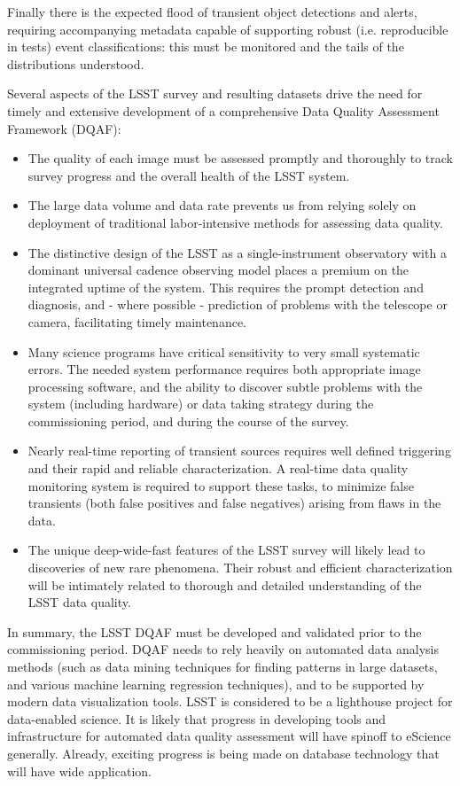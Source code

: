 \documentclass[SE,toc]{lsstdoc}
\begin{document}
Finally there is the expected flood of transient object detections and alerts, requiring accompanying metadata capable of supporting robust (i.e. reproducible in tests) event classifications: this must be monitored and the tails of the distributions understood.

Several aspects of the LSST survey and resulting datasets drive the need for timely and
extensive development of a comprehensive Data Quality Assessment Framework (DQAF):
\begin{itemize}
\item The quality of each image must be assessed promptly and thoroughly to track
         survey progress and the overall health of the LSST system.
\item The large data volume and data rate prevents us from relying solely on deployment of traditional
         labor-intensive methods for assessing data quality.
\item The distinctive design of the LSST as a single-instrument observatory with a dominant universal cadence observing     model places a premium on the integrated uptime of the system.  This requires the prompt detection and diagnosis, and - where possible - prediction of problems with the telescope or camera, facilitating timely maintenance.
\item Many science programs have critical sensitivity to very small systematic errors. The needed system
          performance requires both appropriate image processing software, and the ability
          to discover subtle problems with the system (including hardware) or data taking strategy during the
         commissioning period, and during the course of the survey.
\item Nearly real-time reporting of transient sources requires well defined triggering and their
          rapid and reliable characterization. A real-time data quality monitoring system is required to
          support these tasks, to minimize false transients (both false positives and false negatives) arising from flaws in the data.
\item The unique deep-wide-fast features of the LSST survey will likely lead to discoveries of
          new rare phenomena.  Their robust and efficient characterization will be intimately
          related to thorough and detailed understanding of the LSST data quality.
\end{itemize}

In summary, the LSST DQAF must be developed and validated prior to the commissioning
period. DQAF needs to rely heavily on automated data analysis methods (such as data mining
techniques for finding patterns in large datasets, and various machine learning regression
techniques), and to be supported by modern data visualization tools. LSST is considered to be a lighthouse project for data-enabled science.  It is likely that progress in developing tools and infrastructure for automated data quality assessment will have spinoff to eScience generally. Already, exciting progress is being made on database technology that will have wide application.
\end{document}
